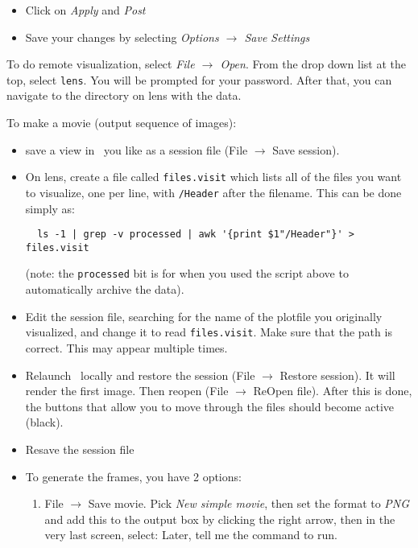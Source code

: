 \begin{itemize}
\item Click on {\em Apply} and {\em Post}

\item Save your changes by selecting {\em Options $\rightarrow$ Save Settings}
\end{itemize}

To do remote visualization, select {\em File $\rightarrow$ Open}.
From the drop down list at the top, select {\tt lens}.  You will be
prompted for your password.  After that, you can navigate to the
directory on lens with the data.

To make a movie (output sequence of images):
\begin{itemize}
\item save a view in \visit\ you like as a session file (File $\rightarrow$ Save session).  
\item On lens, create a file called {\tt files.visit} which lists all
  of the files you want to visualize, one per line, with {\tt /Header}
  after the filename.  This can be done simply as:
  \begin{verbatim}
  ls -1 | grep -v processed | awk '{print $1"/Header"}' > files.visit
  \end{verbatim}
  (note: the {\tt processed} bit is for when you used the script above to 
  automatically archive the data).

\item Edit the session file, searching for the name of the plotfile you
  originally visualized, and change it to read {\tt files.visit}.  Make
  sure that the path is correct.  This may appear multiple times.

\item Relaunch \visit\ locally and restore the session (File $\rightarrow$ Restore session).  It will render the first image.  Then reopen (File $\rightarrow$ ReOpen file).  After this is done, the buttons that allow you to move through the files should become active (black).

\item Resave the session file

\item To generate the frames, you have 2 options:

  \begin{enumerate}
  \item File $\rightarrow$ Save movie.  Pick {\em New simple movie},
    then set the format to {\em PNG} and add this to the output box by
    clicking the right arrow, then in the very last screen, select:
    {Later, tell me the command to run}.


\end{enumerate}
\end{itemize}

